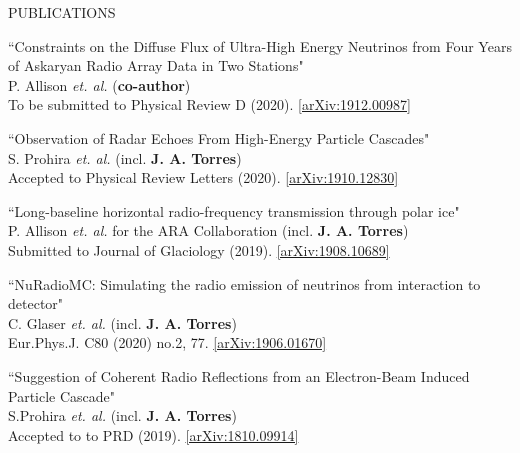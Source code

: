 \documentclass{resume} %
\begin{document}
\begin{rSection}{PUBLICATIONS}
\begin{etaremune}%
 \item ``Constraints on the Diffuse Flux of Ultra-High Energy Neutrinos from Four Years of Askaryan Radio Array Data in Two Stations" \\
 P. Allison {\it et. al.} ({\bf co-author})\\   To be submitted to Physical Review D (2020).  \href{https://arxiv.org/abs/1912.00987}{[arXiv:1912.00987]} 
 
 \item ``Observation of Radar Echoes From High-Energy Particle Cascades" \\
 S. Prohira {\it et. al.} (incl. \textbf{J. A. Torres})\\    Accepted to Physical Review Letters (2020).  \href{https://arxiv.org/abs/1910.12830}{[arXiv:1910.12830]} 
  \item ``Long-baseline horizontal radio-frequency transmission through polar ice" \\
 P. Allison {\it et. al.} for the ARA Collaboration (incl. \textbf{J. A. Torres})\\    Submitted to Journal of Glaciology (2019). \href{https://arxiv.org/abs/1908.10689}{[arXiv:1908.10689]}
  \item ``NuRadioMC: Simulating the radio emission of neutrinos from interaction to detector" \\
 C. Glaser {\it et. al.} (incl. \textbf{J. A. Torres})\\   Eur.Phys.J. C80 (2020) no.2, 77. \href{https://arxiv.org/abs/1906.01670}{[arXiv:1906.01670]} 
  \item ``Suggestion of Coherent Radio Reflections from an Electron-Beam Induced Particle Cascade" \\
 S.Prohira {\it et. al.} (incl. \textbf{J. A. Torres})\\    Accepted to to PRD (2019). \href{https://arxiv.org/abs/1810.09914}{[arXiv:1810.09914]} 
 
 \end{etaremune}
\end{rSection}

\end{document}
